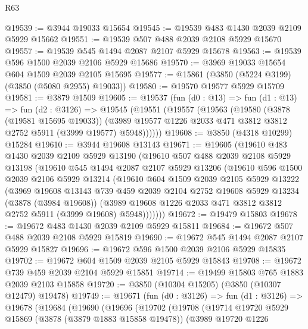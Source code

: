 \begin{lexlean}{R63}
\begin{coremodule}
@19539 := @3944 @19033 @15654
@19545 := @19539 @483 @1430 @2039 @2109 @5929 @15662
@19551 := @19539 @507 @488 @2039 @2108 @5929 @15670
@19557 := @19539 @545 @1494 @2087 @2107 @5929 @15678
@19563 := @19539 @596 @1500 @2039 @2106 @5929 @15686
@19570 := @3969 @19033 @15654 @604 @1509 @2039 @2105 @15695
@19577 := @15861 (@3850 (@5224 @3199) (@3850 (@5080 @2955) @19033))
@19580 := @19570 @19577 @5929 @15709
@19581 := @3879 @1509
@19605 := @19537
    (fun (d0 : @13) =>
    fun (d1 : @13) =>
    fun (d2 : @3126) =>
    @19545
      (@19551
        (@19557
          (@19563
            (@19580
              (@3878 (@19581 @15695 @19033))
              (@3989 @19577 @1226 @2033 @471 @3812 @3812 @2752 @5911 (@3999 @19577) @5948))))))
@19608 := @3850 (@4318 @10299) @15284
@19610 := @3944 @19608 @13143
@19671 := @19605
    (@19610
      @483
      @1430
      @2039
      @2109
      @5929
      @13190
      (@19610
        @507
        @488
        @2039
        @2108
        @5929
        @13198
        (@19610
          @545
          @1494
          @2087
          @2107
          @5929
          @13206
          (@19610
            @596
            @1500
            @2039
            @2106
            @5929
            @13214
            (@19610
              @604
              @1509
              @2039
              @2105
              @5929
              @13222
              (@3969
                @19608
                @13143
                @739
                @459
                @2039
                @2104
                @2752
                @19608
                @5929
                @13234
                (@3878 (@3984 @19608))
                (@3989 @19608 @1226 @2033 @471 @3812 @3812 @2752 @5911 (@3999 @19608) @5948)))))))
@19672 := @19479 @15803
@19678 := @19672 @483 @1430 @2039 @2109 @5929 @15811
@19684 := @19672 @507 @488 @2039 @2108 @5929 @15819
@19690 := @19672 @545 @1494 @2087 @2107 @5929 @15827
@19696 := @19672 @596 @1500 @2039 @2106 @5929 @15835
@19702 := @19672 @604 @1509 @2039 @2105 @5929 @15843
@19708 := @19672 @739 @459 @2039 @2104 @5929 @15851
@19714 := @19499 @15803 @765 @1883 @2039 @2103 @15858
@19720 := @3850 (@10304 @15205) (@3850 (@10307 @12479) @19478)
@19749 := @19671
    (fun (d0 : @3126) =>
    fun (d1 : @3126) =>
    @19678
      (@19684
        (@19690
          (@19696
            (@19702
              (@19708
                (@19714
                  @19720
                  @5929
                  @15869
                  (@3878 (@3879 @1883 @15858 @19478))
                  (@3989
                    @19720
                    @1226

\end{coremodule}
\end{lexlean}
